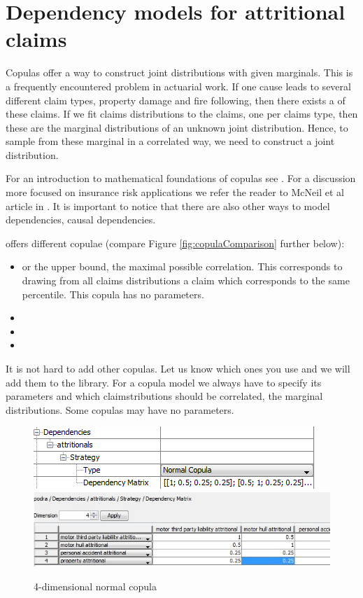 \section{Dependency models for attritional claims}
\label{sec:depAttritional}
Copulas offer a way to construct joint distributions with given marginals. This is a frequently encountered problem in actuarial work. If one cause leads to several different claim types, \eg property damage and fire following, then there exists a  of these claims. If we fit claims distributions to the claims, one per claims type, then these are the marginal distributions of an unknown joint distribution. Hence, to sample from these marginal in a correlated way, we need to construct a joint distribution.
 
For an introduction to mathematical foundations of copulas see \cite{Nelson2006}.
For a discussion more focused on insurance risk applications we refer the reader to McNeil et al article in \cite{McNeil05}.
It is important to notice that there are also other ways to model dependencies, \eg causal dependencies. 

\RA{} offers different copulae (compare Figure \ref{fig:copulaComparison} further below):
\begin{itemize}\tightitemize{0pt}
	\item {} or the  upper bound, \ie the maximal possible correlation. This corresponds to drawing from all claims distributions a claim which corresponds to the same percentile. This copula has no parameters. 
	\item {}
	\item {}
	\item {}
\end{itemize}
It is not hard to add other copulas. Let us know which ones you use and we will add them to the library.
For a copula model we always have to specify its parameters and which claimstributions should be correlated, \ie the marginal distributions. Some copulas may have no parameters.

\begin{figure}
		\centering
		\includegraphics{images/normalCopula1.png}\\[5mm]
		\includegraphics{images/normalCopula2.jpg}
	\caption{4-dimensional normal copula}
	\label{fig:normalCopula}
\end{figure}

